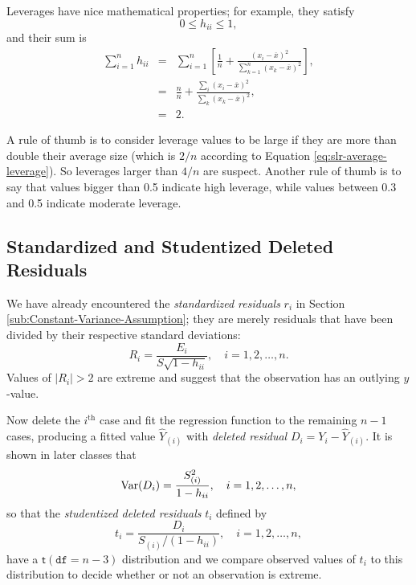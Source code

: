 \documentclass[captions=tableheading]{scrbook}
\begin{document}
Leverages have nice mathematical properties; for example, they satisfy
\begin{equation}
0\leq h_{ii}\leq1,\label{eq:slr-leverage-between}
\end{equation}
and their sum is
\begin{eqnarray}
\sum_{i=1}^{n}h_{ii} & = & \sum_{i=1}^{n}\left[\frac{1}{n}+\frac{(x_{i}-\overline{x})^{2}}{\sum_{k=1}^{n}(x_{k}-\overline{x})^{2}}\right],\\
 & = & \frac{n}{n}+\frac{\sum_{i}(x_{i}-\overline{x})^{2}}{\sum_{k}(x_{k}-\overline{x})^{2}},\\
 & = & 2.\label{eq:slr-average-leverage}
\end{eqnarray}

A rule of thumb is to consider leverage values to be large if they are more than double their average size (which is \(2/n\) according to Equation \ref{eq:slr-average-leverage}). So leverages larger than \(4/n\) are suspect. Another rule of thumb is to say that values bigger than 0.5 indicate high leverage, while values between 0.3 and 0.5 indicate moderate leverage.
\subsection{Standardized and Studentized Deleted Residuals}
\label{sec-11-5-3}


We have already encountered the \emph{standardized residuals} \(r_{i}\) in Section \ref{sub:Constant-Variance-Assumption}; they are merely residuals that have been divided by their respective standard deviations: 
\begin{equation}
R_{i}=\frac{E_{i}}{S\sqrt{1-h_{ii}}},\quad i=1,2,\ldots,n.
\end{equation}
Values of \(|R_{i}| > 2\) are extreme and suggest that the observation has an outlying \(y\)-value. 

Now delete the \(i^{\mathrm{th}}\) case and fit the regression function to the remaining \(n - 1\) cases, producing a fitted value \(\hat{Y}_{(i)}\) with \emph{deleted residual} \(D_{i}=Y_{i}-\hat{Y}_{(i)}\). It is shown in later classes that 
\begin{equation}
\mbox{Var\ensuremath{(D_{i})}}=\frac{S_{(i)}^{2}}{1-h_{ii}},\quad i=1,2,\ldots,n,
\end{equation}
so that the \emph{studentized deleted residuals} \(t_{i}\) defined by
\begin{equation}
t_{i}=\frac{D_{i}}{S_{(i)}/(1-h_{ii})},\quad i=1,2,\ldots,n,\label{eq:slr-studentized-deleted-resids}
\end{equation}
have a \(\mathsf{t}(\mathtt{df}=n-3)\) distribution and we compare observed values of \(t_{i}\) to this distribution to decide whether or not an observation is extreme. 
\end{document}
